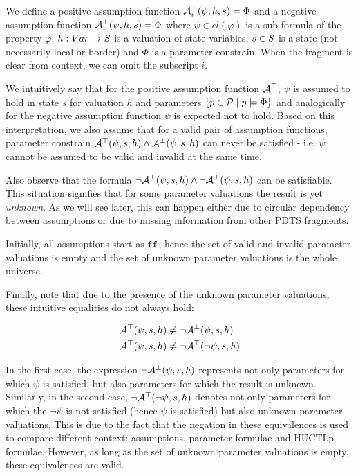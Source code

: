 We define a positive assumption function $\mathcal{A}^\top_i(\psi, h, s) = \Phi$ and a negative assumption function $\mathcal{A}^\bot_i(\psi, h, s) = \Phi$ where $\psi \in cl(\varphi)$ is a sub-formula of the property $\varphi$, $h: Var \to \mathit{S}$ is a valuation of state variables, $s \in \mathit{S}$ is a state (not necessarily local or border) and $\Phi$ is a parameter constrain. When the fragment is clear from context, we can omit the subscript $i$.

We intuitively say that for the positive assumption function $\mathcal{A}^\top$, $\psi$ is assumed to hold in state $s$ for valuation $h$ and parameters $\{p \in \mathcal{P} \mid p \models \Phi \}$ and analogically for the negative assumption function $\psi$ is expected not to hold. Based on this interpretation, we also assume that for a valid pair of assumption functions, parameter constrain $\mathcal{A}^\top(\psi, s, h) \land \mathcal{A}^\bot(\psi, s, h)$ can never be satisfied - i.e. $\psi$ cannot be assumed to be valid and invalid at the same time.

Also observe that the formula $\neg\mathcal{A}^\top(\psi, s, h) \land \neg\mathcal{A}^\bot(\psi, s, h)$ can be satisfiable. This situation signifies that for some parameter valuations the result is yet \emph{unknown}. As we will see later, this can happen either due to circular dependency between assumptions or due to missing information from other \ac{PDTS} fragments.


Initially, all assumptions start as $\texttt{ff}$, hence the set of valid and invalid parameter valuations is empty and the set of unknown parameter valuations is the whole universe.

Finally, note that due to the presence of the unknown parameter valuations, these intuitive equalities do not always hold:

\begin{align*}
	\mathcal{A}^\top(\psi, s, h) & \not= \neg \mathcal{A}^\bot(\psi, s, h) \\
	\mathcal{A}^\top(\psi, s, h) & \not= \neg \mathcal{A}^\top(\neg \psi, s, h)
\end{align*}

In the first case, the expression $\neg \mathcal{A}^\bot(\psi, s, h)$ represents not only parameters for which $\psi$ is satisfied, but also parameters for which the result is unknown. Similarly, in the second case, $\neg \mathcal{A}^\top(\neg \psi, s, h)$ denotes not only parameters for which the $\neg \psi$ is not satisfied (hence $\psi$ is satisfied) but also unknown parameter valuations. This is due to the fact that the negation in these equivalences is used to compare different context: assumptions, parameter formulae and \ac{HUCTLp} formulae. However, as long as the set of unknown parameter valuations is empty, these equivalences are valid.

